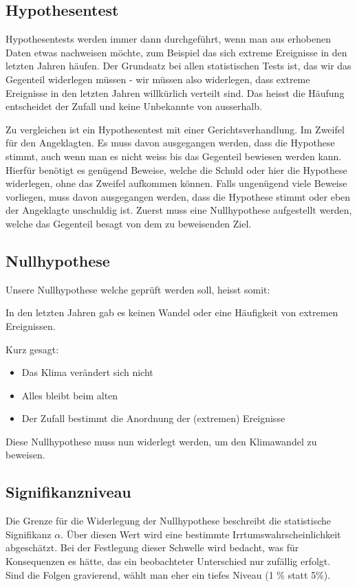 \begin{refsection}
\section{Hypothesentest}
Hypothesentests werden immer dann durchgeführt, wenn man aus erhobenen Daten etwas nachweisen möchte, zum Beispiel das sich extreme Ereignisse in den letzten Jahren häufen. Der Grundsatz bei allen statistischen Tests ist, das wir das Gegenteil widerlegen müssen - wir müssen also widerlegen, dass extreme Ereignisse in den letzten Jahren willkürlich verteilt sind. Das heisst die Häufung entscheidet der Zufall und keine Unbekannte von ausserhalb.

Zu vergleichen ist ein Hypothesentest mit einer Gerichtsverhandlung. Im Zweifel für den Angeklagten. Es muss davon ausgegangen werden, dass die Hypothese stimmt, auch wenn man es nicht weiss bis das Gegenteil bewiesen werden kann. Hierfür benötigt es genügend Beweise, welche die Schuld oder hier die Hypothese widerlegen, ohne das Zweifel aufkommen können. Falls ungenügend viele Beweise vorliegen, muss davon ausgegangen werden, dass die Hypothese stimmt oder eben der Angeklagte unschuldig ist.
Zuerst muss eine Nullhypothese aufgestellt werden, welche das Gegenteil besagt von dem zu beweisenden Ziel.

\subsection{Nullhypothese}
Unsere Nullhypothese welche geprüft werden soll, heisst somit:

In den letzten Jahren gab es keinen Wandel oder eine Häufigkeit von extremen Ereignissen. 

Kurz gesagt:
\begin{itemize}
\item Das Klima verändert sich nicht
\item Alles bleibt beim alten
\item Der Zufall bestimmt die Anordnung der (extremen) Ereignisse
\end{itemize}

Diese Nullhypothese muss nun widerlegt werden, um den Klimawandel zu beweisen.

\subsection{Signifikanzniveau}
Die Grenze für die Widerlegung der Nullhypothese beschreibt die statistische Signifikanz $\alpha$. Über diesen Wert wird eine bestimmte Irrtumswahrscheinlichkeit abgeschätzt. 
Bei der Festlegung dieser Schwelle wird bedacht, was für Konsequenzen es hätte, das ein beobachteter Unterschied nur zufällig erfolgt. Sind die Folgen gravierend, wählt man eher ein tiefes Niveau (1 \% statt 5\%).


\end{refsection}
